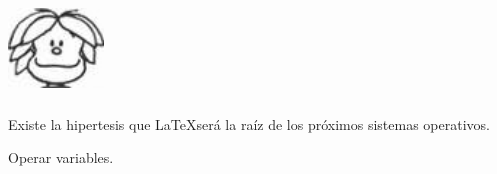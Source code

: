 \hacerglosario %



\begin{grafico}
	\includegraphics[height=1in,width=1in]{figures/Miguelito.jpg}
\end{grafico}


Existe la hipertesis que \LaTeX será la raíz de los próximos sistemas operativos.


Operar variables.